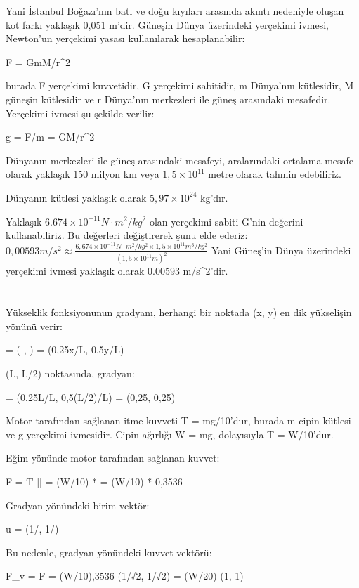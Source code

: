 \documentclass[12pt]{article}
\begin{document}
Yani İstanbul Boğazı'nın batı ve doğu kıyıları arasında akıntı nedeniyle oluşan kot farkı yaklaşık 0,051 m'dir.
\newpage
Güneşin Dünya üzerindeki yerçekimi ivmesi, Newton'un yerçekimi yasası kullanılarak hesaplanabilir:

F = GmM/r^2

burada F yerçekimi kuvvetidir, G yerçekimi sabitidir, m Dünya'nın kütlesidir, M güneşin kütlesidir ve r Dünya'nın merkezleri ile güneş arasındaki mesafedir. Yerçekimi ivmesi şu şekilde verilir:

g = F/m = GM/r^2

Dünyanın merkezleri ile güneş arasındaki mesafeyi, aralarındaki ortalama mesafe olarak yaklaşık 150 milyon km veya 
$1,5\times10^{11}$ metre olarak tahmin edebiliriz. 

Dünyanın kütlesi yaklaşık olarak $5,97\times10^{24}$ kg'dır. 

Yaklaşık $6.674\times10^{-11} N·m^2/kg^2$ olan yerçekimi sabiti G'nin değerini kullanabiliriz. 
Bu değerleri değiştirerek şunu elde ederiz:
\bigbreak
\LARGE$0,00593 m/s^2\approx\frac{6,674\times10^{-11} N·m^2/kg^2\times1,5\times10^{11} m^3/kg^2}{(1,5\times10^11 m)^2}$
\bigbreak
\normalsize
Yani Güneş'in Dünya üzerindeki yerçekimi ivmesi yaklaşık olarak 0.00593 m/s^2'dir.
\newpage
\section{}
Yükseklik fonksiyonunun gradyanı, herhangi bir noktada (x, y) en dik yükselişin yönünü verir:

 = ( ,  ) = (0,25x/L, 0,5y/L)



(L, L/2) noktasında, gradyan:

 = (0,25L/L, 0,5(L/2)/L) = (0,25, 0,25)

Motor tarafından sağlanan itme kuvveti T = mg/10'dur, burada m cipin kütlesi ve g yerçekimi ivmesidir. Cipin ağırlığı W = mg, dolayısıyla T = W/10'dur.

Eğim yönünde motor tarafından sağlanan kuvvet:

F = T \times || = (W/10) *  = (W/10) * 0,3536

Gradyan yönündeki birim vektör:

u = (1/, 1/)

Bu nedenle, gradyan yönündeki kuvvet vektörü:

F_v = F = (W/10),3536 \times (1/√2, 1/√2) = (W/20) \times (1, 1)
\end{document}

